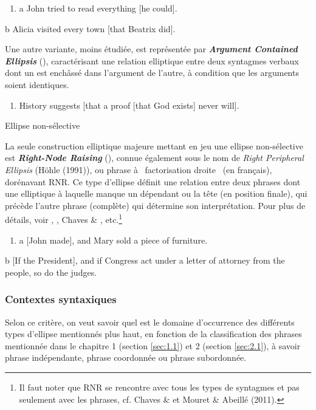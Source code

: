 \begin{enumerate}
\item \label{bkm:Ref302739948}a  John tried to read everything [he could]. 


\end{enumerate}
  b  Alicia visited every town [that Beatrix did].  

Une autre variante, moins étudiée, est représentée par \textbf{\textit{Argument Contained Ellipsis} }(\citet{Kennedy1994}), caractérisant une relation elliptique entre deux syntagmes verbaux dont un est enchâssé dans l'argument de l'autre, à condition que les arguments soient identiques.


\begin{enumerate}
\item History suggests [that a proof [that God exists] never will].  


\end{enumerate}
Ellipse non-sélective

La seule construction elliptique majeure mettant en jeu une ellipse non-sélective est \textbf{\textit{Right-Node Raising}} (\citet{Postal1974}), connue également sous le nom de \textit{Right Peripheral Ellipsis} (Höhle (1991)), ou phrase à {\guillemotleft}~factorisation droite~{\guillemotright} (en français), dorénavant RNR. Ce type d'ellipse définit une relation entre deux phrases dont une elliptique à laquelle manque un dépendant ou la tête (en position finale), qui précède l'autre phrase (complète) qui détermine son interprétation. Pour plus de détails, voir \citet{Abbot1976}, \citet{Hartmann2000}, Chaves \& \citet{Sag2008}, etc.\footnote{Il faut noter que RNR se rencontre avec tous les types de syntagmes et pas seulement avec les phrases, cf. Chaves \& \citet{Sag2008} et Mouret \& Abeillé (2011).} 


\begin{enumerate}
\item a  [John made], and Mary sold a piece of furniture. 


\end{enumerate}
  b  [If the President], and if Congress act under a letter of attorney from the people, so do the judges.  

\subsubsection{Contextes syntaxiques}
\label{bkm:Ref305101970}Selon ce critère, on veut savoir quel est le domaine d'occurrence des différents types d'ellipse mentionnés plus haut, en fonction de la classification des phrases mentionnée dans le chapitre 1 (section \ref{sec:1.1}) et 2 (section \ref{sec:2.1}), à savoir phrase indépendante, phrase coordonnée ou phrase subordonnée.

